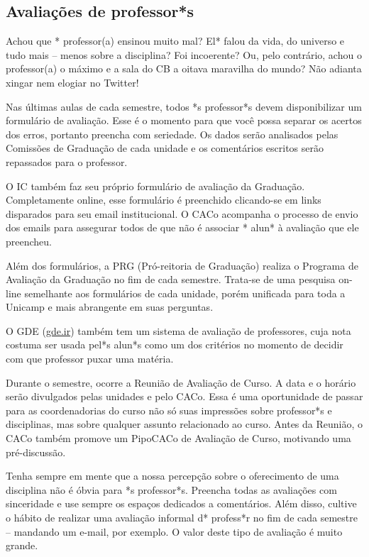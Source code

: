 \subsection{Avaliações de professor*s}

Achou que * professor(a) ensinou muito mal? El* falou da vida, do universo e
tudo mais -- menos sobre a disciplina? Foi incoerente? Ou, pelo contrário, achou
o professor(a) o máximo e a sala do CB a oitava maravilha do mundo? Não adianta
xingar nem elogiar no Twitter!

Nas últimas aulas de cada semestre, todos *s professor*s devem disponibilizar um
formulário de avaliação. Esse é o momento para que você possa separar os acertos
dos erros, portanto preencha com seriedade. Os dados serão analisados pelas
Comissões de Graduação de cada unidade e os comentários escritos serão
repassados para o professor.

O IC também faz seu próprio formulário de avaliação da Graduação. Completamente
online, esse formulário é preenchido clicando-se em links disparados para seu
email institucional. O CACo acompanha o processo de envio dos emails para
assegurar todos de que não é associar * alun* à avaliação que ele preencheu.

Além dos formulários, a PRG (Pró-reitoria de Graduação) realiza o Programa de
Avaliação da Graduação no fim de cada semestre. Trata-se de uma pesquisa on-line
semelhante aos formulários de cada unidade, porém unificada para toda a Unicamp
e mais abrangente em suas perguntas.

O GDE (\url{gde.ir}) também tem um sistema de avaliação de professores, cuja
nota costuma ser usada pel*s alun*s como um dos critérios no momento de decidir
com que professor puxar uma matéria.

Durante o semestre, ocorre a Reunião de Avaliação de Curso. A data e o horário
serão divulgados pelas unidades e pelo CACo. Essa é uma oportunidade de passar
para as coordenadorias do curso não só suas impressões sobre professor*s e
disciplinas, mas sobre qualquer assunto relacionado ao curso. Antes da Reunião,
o CACo também promove um PipoCACo de Avaliação de Curso, motivando uma
pré-discussão.

Tenha sempre em mente que a nossa percepção sobre o oferecimento de uma
disciplina não é óbvia para *s professor*s. Preencha todas as avaliações com
sinceridade e use sempre os espaços dedicados a comentários. Além disso, cultive
o hábito de realizar uma avaliação informal d* profess*r no fim de cada semestre
-- mandando um e-mail, por exemplo. O valor deste tipo de avaliação é muito
grande.
